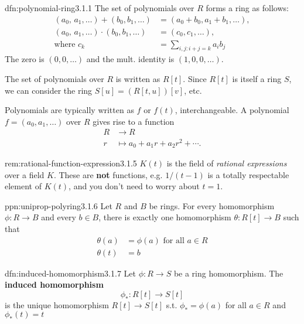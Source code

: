 \documentclass[landscape, 8pt]{extarticle}
\begin{document}
\begin{multicols}{3}
\begin{dfn}{dfn:polynomial-ring}{3.1.1}
    The set of polynomials over $R$ forms a ring as follows:
    \begin{align*}
        (a_{0},\, a_{1} ,\dots) + (b_{0},b_{1},\dots) &= (a_{0}+ b_{0},a_{1}+b_{1},\dots), \\
        (a_{0},\, a_{1} ,\dots) \cdot (b_{0},b_{1},\dots) &= (c_{0},c_{1},\dots), \\
        \text{where } c_{k} &= \sum_{i,j : i + j = k} a_{i}b_{j}
    \end{align*}
    The zero is $(0,0,\dots)$ and the mult. identity is $(1,0,0,\dots)$.

    The set of polynomials over $R$ is written as $R[t]$. Since $R[t]$ is itself a ring $S$, we can consider the ring $S[u] = (R[t,u])[v]$, etc.

    Polynomials are typically written as $f$ or $f(t)$, interchangeable. A polynomial $f = (a_{0},a_{1},\dots)$ over $R$ gives rise to a function
    \begin{align*}
        R &\to R \\
        r &\mapsto a_{0}+a_{1}r+a_{2}r^{2}+\cdots.
    \end{align*}
\end{dfn}


\begin{rem}{rem:rational-function-expression}{3.1.5}
    $K(t)$ is the field of \textit{rational expressions} over a field $K$. These are \textbf{not} functions, e.g. $1 /(t - 1)$ is a totally respectable element of $K(t)$, and you don't need to worry about $t=1$.
\end{rem}

\begin{ppn}{ppn:uniprop-polyring}{3.1.6}
    Let $R$ and $B$ be rings. For every homomorphism $\phi : R \to B$ and every $b\in B$, there is exactly one homomorphism $\theta : R[t] \to B$ such that
    \begin{align*}
        \theta(a) &= \phi(a) \text{ for all } a\in R\\
        \theta(t) &= b
    \end{align*}
\end{ppn}

\begin{dfn}{dfn:induced-homomorphism}{3.1.7}
    Let $\phi : R \to S$ be a ring homomorphism. The \textbf{induced homomorphism}
    \[\phi_{\ast} : R[t] \to S[t]\]
    is the unique homomorphism $R[t] \to S[t]$ s.t. $\phi_{\ast} = \phi(a)$ for all $a\in R$ and $\phi_{\ast}(t) = t$
\end{dfn}


\end{multicols}
\end{document}
